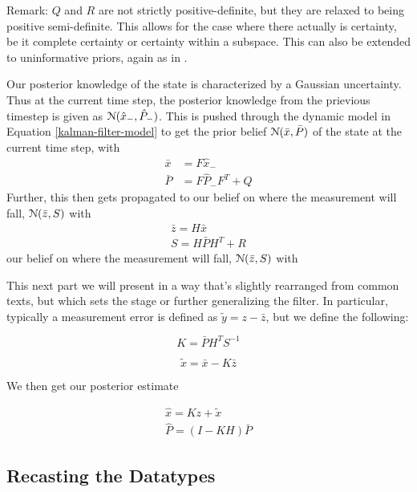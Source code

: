 Remark: $Q$ and $R$ are not strictly positive-definite, but they are relaxed to being positive semi-definite. This allows for the case where there actually is certainty, be it complete certainty or certainty within a subspace. This can also be extended to uninformative priors, again as in \cite{extended-gaussian}.

Our posterior knowledge of the state is characterized by a Gaussian uncertainty.
Thus at the current time step, the posterior knowledge from the prievious timestep is given as $\mathcal{N}(\hat{x}_-, \hat{P}_-)$.
This is pushed through the dynamic model in Equation \ref{kalman-filter-model} to get the prior belief $\mathcal{N}(\bar{x}, \bar{P})$ of the state at the current time step, with
\begin{align}
	\label{kalman-filter-dynamics-push}
	\bar{x} &= F\hat{x}_-\\
	\bar{P} &= F\hat{P}_- F^T + Q
\end{align}
Further, this then gets propagated to our belief on where the measurement will fall, $\mathcal{N}(\bar{z}, S)$ with
\begin{align}
	\label{kalman-filter-measurement-push}
	\bar{z} = H\bar{x}\\
	S = H\bar{P} H^T + R
\end{align}
our belief on where the measurement will fall, $\mathcal{N}(\bar{z}, S)$ with

This next part we will present in a way that's slightly rearranged from common texts, but which sets the stage or further generalizing the filter.
In particular, typically a measurement error is defined as $\tilde{y} = z - \bar{z}$, but we define the following:

\begin{equation}
	K = \bar{P}H^T S^{-1}
\end{equation}

\begin{equation}
	\tilde{x} = \bar{x} - K\bar{z}
\end{equation}

We then get our posterior estimate

\begin{align}
	\hat{x} = Kz + \tilde{x} \\
	\hat{P} = (I-KH)\bar{P}
\end{align}


\subsection{Recasting the Datatypes}

